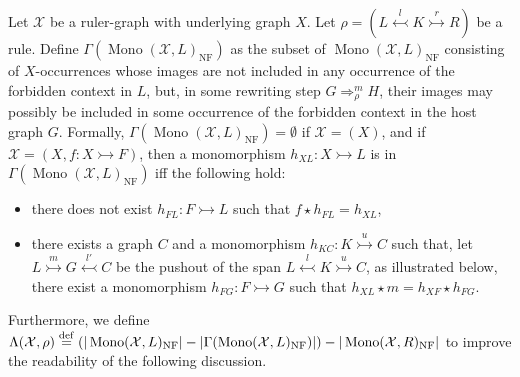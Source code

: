 \begin{definition}
    \label{antipattern:def:gamma_l_rho_x}
    Let $\mathcal{X}$ be a ruler-graph with underlying graph $X$. 
    Let \( \rho = (L \overset{l}{\leftarrowtail} K \overset{r}{\rightarrowtail} R) \) be a rule.
    Define $\Gamma(\operatorname{Mono}(\mathcal{X},L)_{\operatorname{NF}})$ as the subset of $\operatorname{Mono}(\mathcal{X},L)_{\operatorname{NF}}$ consisting of $X$-occurrences whose images are not included in any occurrence of the forbidden context in $L$,
    but, in some rewriting step $G \Rightarrow_\rho^m H$, their images may possibly be included in some occurrence of the forbidden context in the host graph $G$.
    Formally,  $\Gamma(\operatorname{Mono}(\mathcal{X},L)_{\operatorname{NF}}) = \emptyset$ if $\mathcal{X} = (X)$, and if $\mathcal{X} = (X, f:X \rightarrowtail F)$, then a monomorphism $h_{XL}:X \rightarrowtail L$ is in $\Gamma(\operatorname{Mono}(\mathcal{X},L)_{\operatorname{NF}})$ iff the following hold:
    \begin{itemize}
        \item there does not exist $h_{FL}:F \rightarrowtail L$ such that $f \star h_{FL} = h_{XL}$,
         \item there exists a graph $C$ and a monomorphism $h_{KC}:K \overset{u}{\rightarrowtail} C$ such that, let $L \overset{m}{\rightarrowtail} G \overset{l'}{\leftarrowtail} C$ be the pushout of the span $L \overset{l}{\leftarrowtail} K \overset{u}{\rightarrowtail} C$, as illustrated below,
         there exist a monomorphism $h_{FG} : F \rightarrowtail G$ such that 
         $h_{XL} \star m = h_{XF} \star h_{FG}$. 

    \end{itemize}
    Furthermore, we define $\Lambda(\mathcal{X},\rho) \overset{\operatorname{def}}{=} (|\operatorname{Mono}(\mathcal{X},L)_{\operatorname{NF}}| - 
    |\Gamma(\operatorname{Mono}(\mathcal{X},L)_{\operatorname{NF}})|) -
   |\operatorname{Mono}(\mathcal{X},R)_{\operatorname{NF}}|$ to improve the readability of the following discussion.
\end{definition}
